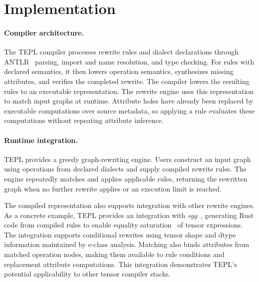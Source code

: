 \section{Implementation}
\label{sec:implementation}
\label{sec:symbolic-bridge}
\paragraph{Compiler architecture.}
The TEPL compiler processes rewrite rules and dialect declarations through
ANTLR~\cite{antlr} parsing, import and name resolution, and type checking. For rules
with declared semantics, it then lowers operation semantics, synthesizes
missing attributes, and verifies the completed rewrite. The compiler lowers
the resulting rules to an executable representation. The rewrite engine
uses this representation to match input graphs at runtime. Attribute holes have already been replaced by executable
computations over source metadata, so applying a rule evaluates these
computations without repeating attribute inference.

\paragraph{Runtime integration.}
TEPL provides a greedy graph-rewriting engine. Users construct an input
graph using operations from declared dialects and supply compiled rewrite
rules. The engine repeatedly matches and applies applicable rules, returning
the rewritten graph when no further rewrite applies or an execution limit
is reached.

The compiled representation also supports integration with other rewrite
engines. As a concrete example, TEPL provides an integration with
\emph{egg}~\cite{egg}, generating Rust code from compiled rules to enable
equality saturation~\cite{equality-saturation} of tensor expressions. The integration supports
conditional rewrites using tensor shape and dtype information maintained
by e-class analysis. Matching also binds attributes from matched operation
nodes, making them available to rule conditions and replacement attribute
computations. This integration demonstrates TEPL's potential applicability to other
tensor compiler stacks.
